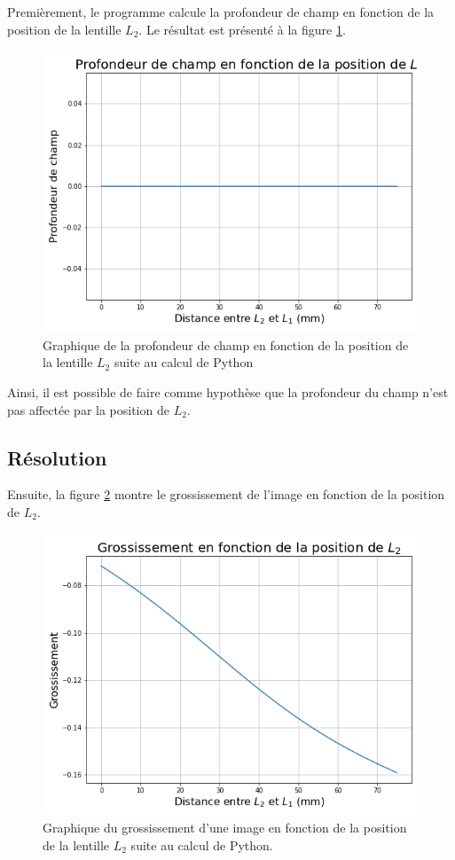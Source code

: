 \documentclass[11pt,letterpaper]{article}
\begin{document}
Premièrement, le programme calcule la profondeur de champ en fonction de la position de
la lentille $L_2$. Le résultat est présenté à la figure \ref{prof_champ_plot}.

\begin{figure}[H]
  \centering
  \includegraphics[scale=0.55]{prof_champ.png}
  \caption{Graphique de la profondeur de champ en fonction de la position de la lentille 
  $L_2$ suite au calcul de Python}
  \label{prof_champ_plot}
\end{figure}

Ainsi, il est possible de faire comme hypothèse que la profondeur du champ n'est pas affectée
par la position de $L_2$.

\subsection{Résolution}

Ensuite, la figure \ref{gross_plot} montre le grossissement de l'image en fonction de la
position de $L_2$.

\begin{figure}[H]
  \centering
  \includegraphics[scale=0.55]{grossissement.png}
  \caption{Graphique du grossissement d'une image en fonction de la position de la lentille
  $L_2$ suite au calcul de Python.}
  \label{gross_plot}
\end{figure}
\end{document}
